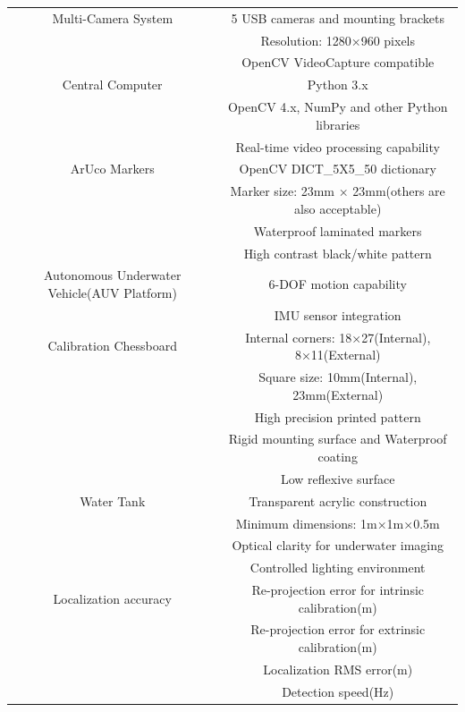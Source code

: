 \documentclass[11pt]{article}
\begin{document}
\begin{longtable}[c]{| c | c |}
                Multi-Camera System 
                & 5 USB cameras  and mounting brackets\\
                & Resolution: 1280×960 pixels \\
                & OpenCV VideoCapture compatible \\
                \hline
                Central Computer 
                & Python 3.x   \\
                & OpenCV 4.x, NumPy and other Python libraries \\
                & Real-time video processing capability \\
                \hline
                ArUco Markers 
                & OpenCV DICT\_5X5\_50 dictionary \\
                & Marker size: 23mm × 23mm(others are also acceptable) \\
                & Waterproof laminated markers \\
                & High contrast black/white pattern \\
                \hline
                Autonomous Underwater Vehicle(AUV Platform) 
                & 6-DOF motion capability \\
                & IMU sensor integration \\
                \hline
                \pagebreak
                \hline
                Calibration Chessboard
                & Internal corners: 18×27(Internal), 8×11(External)\\
                & Square size: 10mm(Internal), 23mm(External)  \\
                & High precision printed pattern \\
                & Rigid mounting surface and  Waterproof coating\\
                & Low reflexive surface\\
                \hline
                Water Tank 
                & Transparent acrylic construction \\
                & Minimum dimensions: 1m×1m×0.5m \\
                & Optical clarity for underwater imaging \\
                & Controlled lighting environment \\
                \hline
                Localization accuracy 
                & Re-projection error for intrinsic calibration(m) \\
                & Re-projection error for extrinsic calibration(m) \\
                & Localization RMS error(m) \\
                & Detection speed(Hz) \\
                \hline
            \end{longtable}
\end{document}
